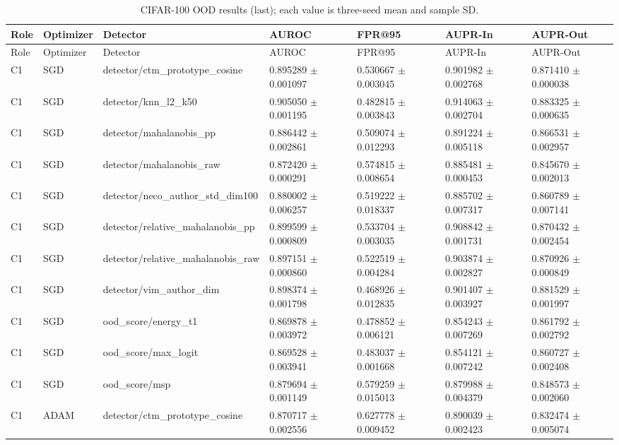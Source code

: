 \begin{longtable}{lllllll}
\caption{CIFAR-100 OOD results (last); each value is three-seed mean and sample SD.}\\
Role & Optimizer & Detector & AUROC & FPR@95 & AUPR-In & AUPR-Out \\
\hline
\endfirsthead
Role & Optimizer & Detector & AUROC & FPR@95 & AUPR-In & AUPR-Out \\
\hline
\endhead
C1 & SGD & detector/ctm\_prototype\_cosine & 0.895289 $\pm$ 0.001097 & 0.530667 $\pm$ 0.003045 & 0.901982 $\pm$ 0.002768 & 0.871410 $\pm$ 0.000038 \\
C1 & SGD & detector/knn\_l2\_k50 & 0.905050 $\pm$ 0.001195 & 0.482815 $\pm$ 0.003843 & 0.914063 $\pm$ 0.002704 & 0.883325 $\pm$ 0.000635 \\
C1 & SGD & detector/mahalanobis\_pp & 0.886442 $\pm$ 0.002861 & 0.509074 $\pm$ 0.012293 & 0.891224 $\pm$ 0.005118 & 0.866531 $\pm$ 0.002957 \\
C1 & SGD & detector/mahalanobis\_raw & 0.872420 $\pm$ 0.000291 & 0.574815 $\pm$ 0.008654 & 0.885481 $\pm$ 0.000453 & 0.845670 $\pm$ 0.002013 \\
C1 & SGD & detector/neco\_author\_std\_dim100 & 0.880002 $\pm$ 0.006257 & 0.519222 $\pm$ 0.018337 & 0.885702 $\pm$ 0.007317 & 0.860789 $\pm$ 0.007141 \\
C1 & SGD & detector/relative\_mahalanobis\_pp & 0.899599 $\pm$ 0.000809 & 0.533704 $\pm$ 0.003035 & 0.908842 $\pm$ 0.001731 & 0.870432 $\pm$ 0.002454 \\
C1 & SGD & detector/relative\_mahalanobis\_raw & 0.897151 $\pm$ 0.000860 & 0.522519 $\pm$ 0.004284 & 0.903874 $\pm$ 0.002827 & 0.870926 $\pm$ 0.000849 \\
C1 & SGD & detector/vim\_author\_dim & 0.898374 $\pm$ 0.001798 & 0.468926 $\pm$ 0.012835 & 0.901407 $\pm$ 0.003927 & 0.881529 $\pm$ 0.001997 \\
C1 & SGD & ood\_score/energy\_t1 & 0.869878 $\pm$ 0.003972 & 0.478852 $\pm$ 0.006121 & 0.854243 $\pm$ 0.007269 & 0.861792 $\pm$ 0.002792 \\
C1 & SGD & ood\_score/max\_logit & 0.869528 $\pm$ 0.003941 & 0.483037 $\pm$ 0.001668 & 0.854121 $\pm$ 0.007242 & 0.860727 $\pm$ 0.002408 \\
C1 & SGD & ood\_score/msp & 0.879694 $\pm$ 0.001149 & 0.579259 $\pm$ 0.015013 & 0.879988 $\pm$ 0.004379 & 0.848573 $\pm$ 0.002060 \\
C1 & ADAM & detector/ctm\_prototype\_cosine & 0.870717 $\pm$ 0.002556 & 0.627778 $\pm$ 0.009452 & 0.890039 $\pm$ 0.002423 & 0.832474 $\pm$ 0.005074 \\

\end{longtable}
